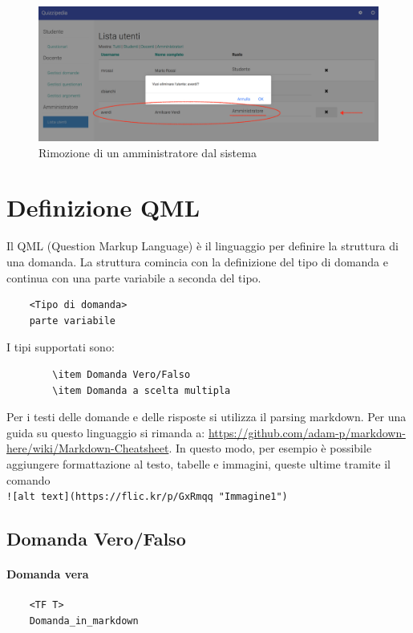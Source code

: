 \documentclass[12pt,a4paper]{article}
\begin{document}
		\begin{figure}[H]
			\centering
			\includegraphics[width=1\linewidth]{../img/screenshot/rimozioneAmministratore.png}
			\caption{Rimozione di un amministratore dal sistema}
			\label{Rimozione di un amministratore dal sistema}
		\end{figure}
	
	\section{Definizione QML}
	Il QML (Question Markup Language) è il linguaggio per definire la struttura di una domanda. La struttura comincia con la definizione del tipo di domanda e continua con una parte variabile a seconda del tipo.\\
	\begin{verbatim}
	<Tipo di domanda>
	parte variabile
	\end{verbatim}
		
	 I tipi supportati sono:
	\begin{verbatim}
		\item Domanda Vero/Falso
		\item Domanda a scelta multipla
	\end{verbatim}
	Per i testi delle domande e delle risposte si utilizza il parsing markdown. Per una guida su questo linguaggio si rimanda a: \url{https://github.com/adam-p/markdown-here/wiki/Markdown-Cheatsheet}. In questo modo, per esempio è possibile aggiungere formattazione al testo, tabelle e immagini, queste ultime tramite il comando\\
	 \texttt{![alt text](https://flic.kr/p/GxRmqq "Immagine1")}\\
		
	\subsection{Domanda Vero/Falso}
	\paragraph{Domanda vera}
	\begin{verbatim}
	<TF T>
	Domanda_in_markdown
	\end{verbatim}
\end{document}

